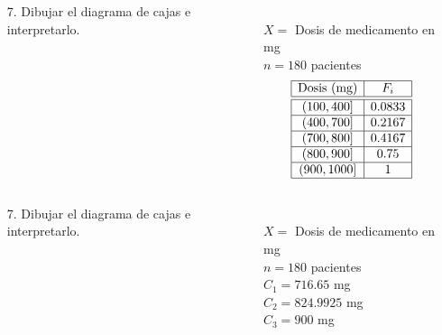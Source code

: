 \documentclass[aspectratio=149,10pt,xcolor=dvipsnames,t]{beamer}
\begin{document}
\begin{frame}
\begin{columns}
\begin{column}[T]{0.65\textwidth}
\begin{enumerate}
\item[7.] Dibujar el diagrama de cajas e interpretarlo. 
\end{enumerate}
\end{column}
\begin{column}[T]{0.35\textwidth}
\\
$X=$ Dosis de medicamento en mg\\
$n=180$ pacientes\\
\[
\begin{array}{|c|c|}
\hline
\textrm{Dosis (mg)} & F_i\\
\hline\hline
(100,400] & 0.0833 \\
\hline
(400,700] & 0.2167\\
\hline
(700,800] & 0.4167 \\
\hline
(800,900] & 0.75 \\
\hline
(900,1000] & 1 \\
\hline
\end{array}
\]
\end{column}
\end{columns}
\end{frame}


\begin{frame}
\begin{columns}
\begin{column}[T]{0.65\textwidth}
\begin{enumerate}
\item[7.] Dibujar el diagrama de cajas e interpretarlo. 
\end{enumerate}
\end{column}
\begin{column}[T]{0.35\textwidth}
\\
$X=$ Dosis de medicamento en mg\\
$n=180$ pacientes\\
$C_1=716.65$ mg\\
$C_2=824.9925$ mg\\
$C_3=900$ mg
\end{column}
\end{columns}
\end{frame}
\end{document}
